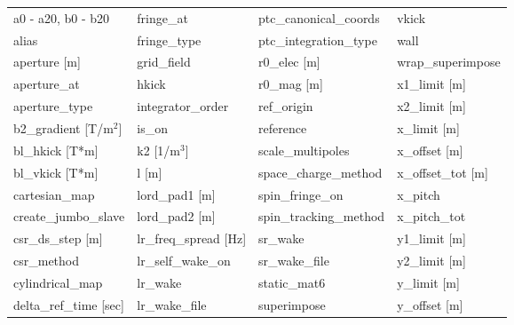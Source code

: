  \begin{tabular}{llll} \toprule
a0 - a20, b0 - b20               & fringe_at                        & ptc_canonical_coords             & vkick                            \\
alias                            & fringe_type                      & ptc_integration_type             & wall                             \\
aperture [m]                     & grid_field                       & r0_elec [m]                      & wrap_superimpose                 \\
aperture_at                      & hkick                            & r0_mag [m]                       & x1_limit [m]                     \\
aperture_type                    & integrator_order                 & ref_origin                       & x2_limit [m]                     \\
b2_gradient [T/m$^2$]            & is_on                            & reference                        & x_limit [m]                      \\
bl_hkick [T*m]                   & k2 [1/m$^3$]                     & scale_multipoles                 & x_offset [m]                     \\
bl_vkick [T*m]                   & l [m]                            & space_charge_method              & x_offset_tot [m]                 \\
cartesian_map                    & lord_pad1 [m]                    & spin_fringe_on                   & x_pitch                          \\
create_jumbo_slave               & lord_pad2 [m]                    & spin_tracking_method             & x_pitch_tot                      \\
csr_ds_step [m]                  & lr_freq_spread [Hz]              & sr_wake                          & y1_limit [m]                     \\
csr_method                       & lr_self_wake_on                  & sr_wake_file                     & y2_limit [m]                     \\
cylindrical_map                  & lr_wake                          & static_mat6                      & y_limit [m]                      \\
delta_ref_time [sec]             & lr_wake_file                     & superimpose                      & y_offset [m]                     \\

\end{tabular}
